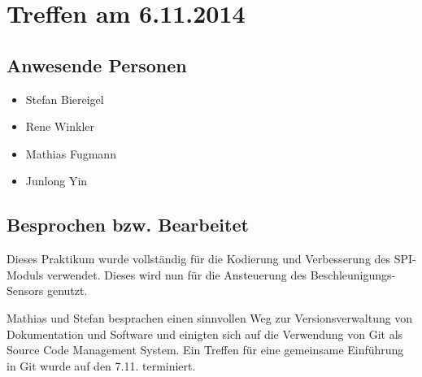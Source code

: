 \chapter{Treffen am 6.11.2014}
\section{Anwesende Personen}
\begin{itemize}
	\item Stefan Biereigel
	\item Rene Winkler
	\item Mathias Fugmann
	\item Junlong Yin
\end{itemize}

\section{Besprochen bzw. Bearbeitet}
Dieses Praktikum wurde vollständig für die Kodierung und Verbesserung des SPI-Moduls verwendet. Dieses wird nun für die Ansteuerung des Beschleunigungs-Sensors genutzt.

Mathias und Stefan besprachen einen sinnvollen Weg zur Versionsverwaltung von Dokumentation und Software und einigten sich auf die Verwendung von Git als Source Code Management System. Ein Treffen für eine gemeinsame Einführung in Git wurde auf den 7.11. terminiert. 